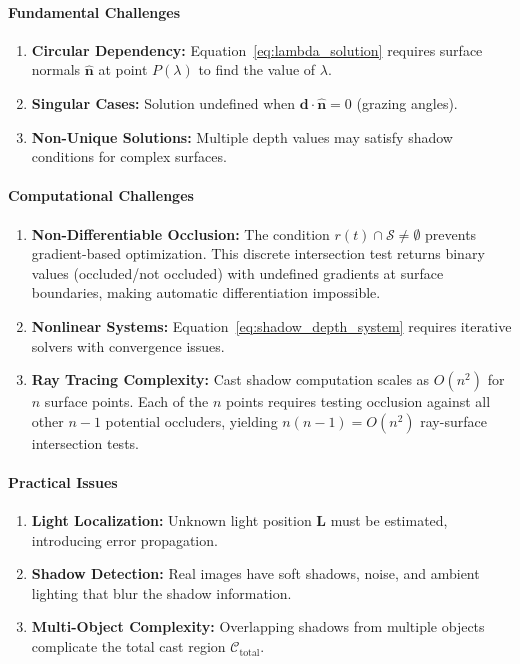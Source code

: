 \documentclass[12pt]{article}
\newcommand{\vect}[1]{\bm{#1}}
\theoremstyle{definition}
\begin{document}
\paragraph{Fundamental Challenges}
\begin{enumerate}[label=\arabic*.]
    \item \textbf{Circular Dependency:} Equation~\eqref{eq:lambda_solution} requires surface normals $\hat{\vect{n}}$ at point $P(\lambda)$ to find the value of $\lambda$.
    
    \item \textbf{Singular Cases:} Solution undefined when $\vect{d} \cdot \hat{\vect{n}} = 0$ (grazing angles).
    
    \item \textbf{Non-Unique Solutions:} Multiple depth values may satisfy shadow conditions for complex surfaces.
\end{enumerate}

\paragraph{Computational Challenges}
\begin{enumerate}[label=\arabic*., resume]
    \item \textbf{Non-Differentiable Occlusion:} The condition $r(t) \cap \mathcal{S} \neq \emptyset$ prevents gradient-based optimization. This discrete intersection test returns binary values (occluded/not occluded) with undefined gradients at surface boundaries, making automatic differentiation impossible.
    
    \item \textbf{Nonlinear Systems:} Equation~\eqref{eq:shadow_depth_system} requires iterative solvers with convergence issues.
    
    \item \textbf{Ray Tracing Complexity:} Cast shadow computation scales as $O(n^2)$ for $n$ surface points. Each of the $n$ points requires testing occlusion against all other $n-1$ potential occluders, yielding $n(n-1) = O(n^2)$ ray-surface intersection tests.
\end{enumerate}

\paragraph{Practical Issues}
\begin{enumerate}[label=\arabic*., resume]
    \item \textbf{Light Localization:} Unknown light position $\vect{L}$ must be estimated, introducing error propagation.
    
    \item \textbf{Shadow Detection:} Real images have soft shadows, noise, and ambient lighting that blur the shadow information.
    
    \item \textbf{Multi-Object Complexity:} Overlapping shadows from multiple objects complicate the total cast region $\mathcal{C}_{\text{total}}$.
\end{enumerate}
\end{document}
